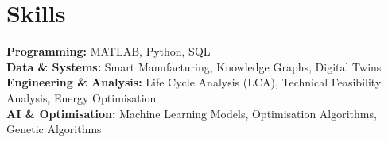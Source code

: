 \documentclass[letterpaper,11pt]{article}
\begin{document}
\section{Skills}
\small{
\textbf{Programming:} MATLAB, Python, SQL \\ 
\textbf{Data \& Systems:} Smart Manufacturing, Knowledge Graphs, Digital Twins \\ 
\textbf{Engineering \& Analysis:} Life Cycle Analysis (LCA), Technical Feasibility Analysis, Energy Optimisation \\ 
\textbf{AI \& Optimisation:} Machine Learning Models, Optimisation Algorithms, Genetic Algorithms}
\end{document}

